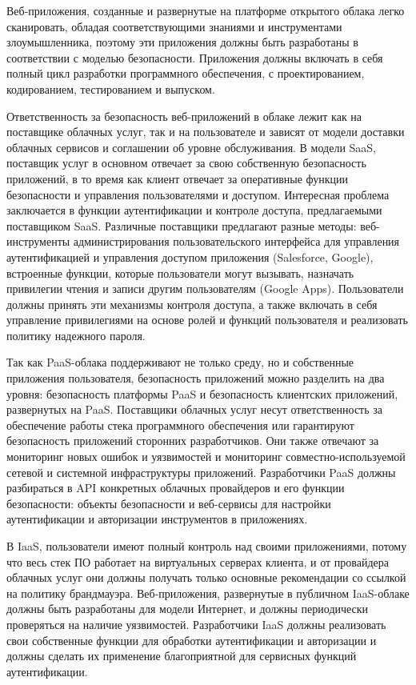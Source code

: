 Веб-приложения, созданные и развернутые на платформе открытого облака легко сканировать, обладая соответствующими знаниями и инструментами злоумышленника, поэтому эти приложения должны быть разработаны в соответствии с моделью безопасности.
Приложения должны включать в себя полный цикл разработки программного обеспечения, с проектированием, кодированием, тестированием и выпуском.

Ответственность за безопасность веб-приложений в облаке лежит как на поставщике облачных услуг, так и на пользователе и зависят от модели доставки облачных сервисов и соглашении об уровне обслуживания.
В модели SaaS, поставщик услуг в основном отвечает за свою собственную безопасность приложений, в то время как клиент отвечает за оперативные функции безопасности и управления пользователями и доступом.
Интересная проблема заключается в функции аутентификации и контроле доступа, предлагаемыми поставщиком SaaS.
Различные поставщики предлагают разные методы: веб-инструменты администрирования пользовательского интерфейса для управления аутентификацией и управления доступом приложения (Salesforce, Google), встроенные функции, которые пользователи могут вызывать, назначать привилегии чтения и записи другим пользователям (Google Apps).
Пользователи должны принять эти механизмы контроля доступа, а также включать в себя управление привилегиями на основе ролей и функций пользователя и реализовать политику надежного пароля.

Так как PaaS-облака поддерживают не только среду, но и собственные приложения пользователя, безопасность приложений можно разделить на два уровня: безопасность платформы PaaS и безопасность клиентских приложений, развернутых на PaaS.
Поставщики облачных услуг несут ответственность за обеспечение работы стека программного обеспечения или гарантируют безопасность приложений сторонних разработчиков.
Они также отвечают за мониторинг новых ошибок и уязвимостей и мониторинг совместно-используемой сетевой и системной инфраструктуры приложений.
Разработчики PaaS должны разбираться в API конкретных облачных провайдеров и его функции безопасности: объекты безопасности и веб-сервисы для настройки аутентификации и авторизации инструментов в приложениях.

В IaaS, пользователи имеют полный контроль над своими приложениями, потому что весь стек ПО работает на виртуальных серверах клиента, и от провайдера облачных услуг они должны получать только основные рекомендации со ссылкой на политику брандмауэра.
Веб-приложения, развернутые в публичном IaaS-облаке должны быть разработаны для модели Интернет, и должны периодически проверяться на наличие уязвимостей.
Разработчики IaaS должны реализовать свои собственные функции для обработки аутентификации и авторизации и должны сделать их применение благоприятной для сервисных функций аутентификации.

\clearpage
